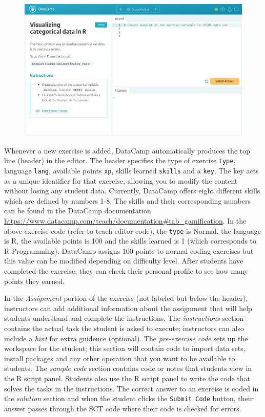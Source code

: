 \documentclass[12pt]{article}\usepackage[]{graphicx}\usepackage[]{color}
\begin{document}
\begin{figure}[h]
  \includegraphics[scale = 0.40] {preview.jpg}
\end{figure}

Whenever a new exercise is added, DataCamp automatically produces the top line (header) in the editor. The header specifies the type
of exercise \texttt{type}, language \texttt{lang}, available points \texttt{xp}, skills learned \texttt{skills} and a \texttt{key}. The key acts as a unique
identifier for that exercise, allowing you to modify the content without losing any student data. Currently, DataCamp offers
eight different skills which are defined by numbers 1-8. The skills and their corresponding numbers can be found in the DataCamp
documentation \url{https://www.datacamp.com/teach/documentation#tab_gamification}. 
In the above exercise code (refer to teach editor code), the \texttt{type} is Normal, the language is R, the available points is 100 and the skills learned is 1 (which 
corresponds to R Programming). DataCamp assigns 100 points to normal coding exercises but this value can be modified depending on
difficulty level. After students have completed the exercise, they can check their personal profile to see how many points they earned.


In the \textit{Assignment} portion of the exercise (not labeled but below the header), instructors can add additional information about the assignment that will help
students understand and complete the instructions. The \textit{instructions} section contains the actual task the student is
asked to execute; instructors can also include a \textit{hint} for extra guidence (optional). The \textit{pre-exercise code} sets up the workspace for 
the student; this section will contain code to import data sets, install packages and any other operation that you want to be available to
students. The \textit{sample code} section contains code or notes that students view in the R script panel. Students also use the R script panel to write
the code that solves the tasks in the instructions. The correct answer to an exercise is coded in the \textit{solution} section
and when the student clicks the \texttt{Submit Code} button, their answer passes through the SCT code where their code is checked for errors.
\end{document}
